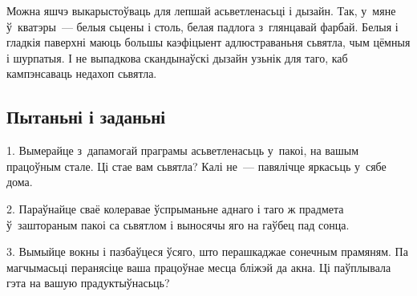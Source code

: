 Можна яшчэ выкарыстоўваць для лепшай асьветленасьці і дызайн. Так, у~мяне ў~кватэры~--- белыя сьцены і столь, белая падлога з~глянцавай фарбай. Белыя і гладкія паверхні маюць большы каэфіцыент адлюстраваньня сьвятла, чым цёмныя і шурпатыя. І не выпадкова скандынаўскі дызайн узьнік для таго, каб кампэнсаваць недахоп сьвятла.

\subsection*{Пытаньні і заданьні}

1. Вымерайце з~дапамогай праграмы асьветленасьць у~пакоі, на вашым працоўным стале. Ці стае вам сьвятла? Калі не~--- павялічце яркасьць у~сябе дома.

2. Параўнайце сваё колеравае ўспрыманьне аднаго і таго ж прадмета ў~заштораным пакоі са сьвятлом і выносячы яго на гаўбец пад сонца.

3. Вымыйце вокны і пазбаўцеся ўсяго, што перашкаджае сонечным прамяням. Па магчымасьці перанясіце ваша працоўнае месца бліжэй да акна. Ці паўплывала гэта на вашую прадуктыўнасьць?
